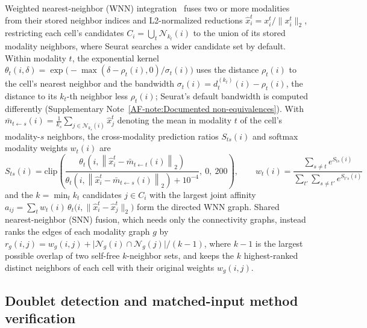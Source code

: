 \documentclass[11pt]{article}
\newcommand{\sref}[1]{\ref*{AF-#1}}
\begin{document}
Weighted nearest-neighbor (WNN) integration~\cite{hao2021} fuses two or more modalities from their stored neighbor indices and L2-normalized reductions $\hat x_i^{t}=x_i^{t}/\lVert x_i^{t}\rVert_2$, restricting each cell's candidates $C_i=\bigcup_t\mathcal{N}_{k_t}(i)$ to the union of its stored modality neighbors, where Seurat searches a wider candidate set by default. Within modality $t$, the exponential kernel $\theta_t(i,\delta)=\exp\bigl(-\max(\delta-\rho_t(i),0)/\sigma_t(i)\bigr)$ uses the distance $\rho_t(i)$ to the cell's nearest neighbor and the bandwidth $\sigma_t(i)=d_t^{(k_t)}(i)-\rho_t(i)$, the distance to its $k_t$-th neighbor less $\rho_t(i)$; Seurat's default bandwidth is computed differently (Supplementary Note~\sref{note:Documented non-equivalences}). With $\bar m_{t\leftarrow s}(i)=\frac{1}{k_s}\sum_{j\in\mathcal{N}_{k_s}(i)}\hat x_j^{t}$ denoting the mean in modality $t$ of the cell's modality-$s$ neighbors, the cross-modality prediction ratios $S_{ts}(i)$ and softmax modality weights $w_t(i)$ are
\[
S_{ts}(i)=\mathrm{clip}\left(\frac{\theta_t\left(i,\left\lVert\hat x^{t}_i-\bar m_{t\leftarrow t}(i)\right\rVert_2\right)}{\theta_t\left(i,\left\lVert\hat x^{t}_i-\bar m_{t\leftarrow s}(i)\right\rVert_2\right)+10^{-4}},\ 0,\ 200\right),\qquad w_t(i)=\frac{\sum_{s\neq t}e^{S_{ts}(i)}}{\sum_{t'}\sum_{s\neq t'}e^{S_{t's}(i)}}
\]
and the $k=\min_t k_t$ candidates $j\in C_i$ with the largest joint affinity $a_{ij}=\sum_{t}w_t(i)\,\theta_t\bigl(i,\lVert\hat x^{t}_i-\hat x^{t}_j\rVert_2\bigr)$ form the directed WNN graph. Shared nearest-neighbor (SNN) fusion, which needs only the connectivity graphs, instead ranks the edges of each modality graph $g$ by $r_g(i,j)=w_g(i,j)+\lvert\mathcal{N}_g(i)\cap\mathcal{N}_g(j)\rvert/(k-1)$, where $k-1$ is the largest possible overlap of two self-free $k$-neighbor sets, and keeps the $k$ highest-ranked distinct neighbors of each cell with their original weights $w_g(i,j)$.

\subsection*{Doublet detection and matched-input method verification}\label{sec:Other methods}
\end{document}
